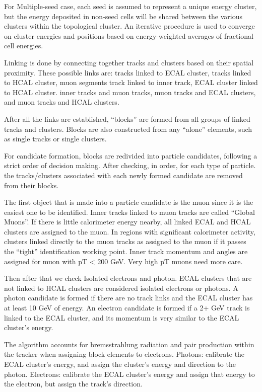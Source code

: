 For Multiple-seed case, each seed is assumed to represent a unique energy cluster, but the energy deposited in non-seed cells will be shared between the various clusters within the topological cluster.  An iterative procedure is used to converge on cluster energies and positions based on energy-weighted averages of fractional cell energies.

Linking is done by connecting together tracks and clusters based on their spatial proximity. These possible links are: tracks linked to ECAL cluster, tracks linked to HCAL cluster, muon segments track linked to inner track, ECAL cluster linked to HCAL cluster. inner tracks and muon tracks, muon tracks and ECAL clusters, and muon tracks and HCAL clusters. 

After all the links are established, “blocks” are formed from all groups of linked tracks and clusters. Blocks are also constructed from any “alone” elements, such as single tracks or single clusters. 

For candidate formation, blocks are redivided into particle candidates, following a strict order of decision making. After checking, in order, for each type of particle. the tracks/clusters associated with each newly formed candidate are removed from their blocks.

The first object that is made into a particle candidate is the muon since it is the easiest one to be identified. Inner tracks linked to muon tracks are called “Global Muons”. If there is little calorimeter energy nearby, all linked ECAL and HCAL clusters are assigned to the muon. In regions with significant calorimeter activity, clusters linked directly to the muon tracks as assigned to the muon if it passes the “tight” identification working point. Inner track momentum and angles are assigned for muon with pT < 200 GeV. Very high pT muons need more care.  

Then after that we check Isolated electrons and photon. ECAL clusters that are not linked to HCAL clusters are considered isolated electrons or photons.  A photon candidate is formed if there are no track links and the ECAL cluster has at least 10 GeV of energy.  An electron candidate is formed if a 2+ GeV track is linked to the ECAL cluster, and its momentum is very similar to the ECAL cluster’s energy.   

The algorithm accounts for bremsstrahlung radiation and pair production within the tracker when assigning block elements to electrons. Photons: calibrate the ECAL cluster’s energy, and assign the cluster’s energy and direction to the photon. Electrons: calibrate the ECAL cluster’s energy and assign that energy to the electron, but assign the track’s direction. 


